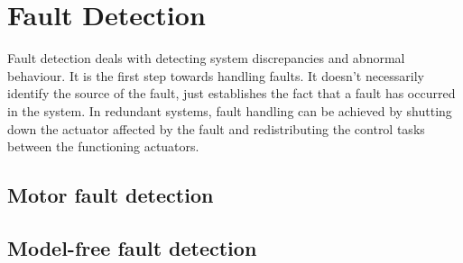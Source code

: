 \newpage
\section{Fault Detection}

Fault detection deals with detecting system discrepancies and abnormal behaviour. It is the first step towards handling faults. It doesn't necessarily identify the source of the fault, just establishes the fact that a fault has occurred in the system. In redundant systems, fault handling can be achieved by shutting down the actuator affected by the fault and redistributing the control tasks between the functioning actuators.


\subsection{Motor fault detection}


\subsection{Model-free fault detection}















